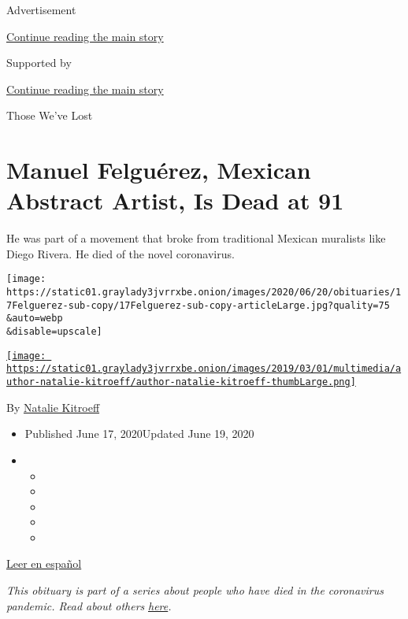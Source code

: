 Advertisement

\protect\hyperlink{after-top}{Continue reading the main story}

Supported by

\protect\hyperlink{after-sponsor}{Continue reading the main story}

Those We've Lost

\hypertarget{manuel-felguuxe9rez-mexican-abstract-artist-is-dead-at-91}{%
\section{Manuel Felguérez, Mexican Abstract Artist, Is Dead at
91}\label{manuel-felguuxe9rez-mexican-abstract-artist-is-dead-at-91}}

He was part of a movement that broke from traditional Mexican muralists
like Diego Rivera. He died of the novel coronavirus.

\texttt{[image: https://static01.graylady3jvrrxbe.onion/images/2020/06/20/obituaries/17Felguerez-sub-copy/17Felguerez-sub-copy-articleLarge.jpg?quality=75\\\&auto=webp\\\&disable=upscale]}

\href{https://www.nytimes3xbfgragh.onion/by/natalie-kitroeff}{\texttt{[image: https://static01.graylady3jvrrxbe.onion/images/2019/03/01/multimedia/author-natalie-kitroeff/author-natalie-kitroeff-thumbLarge.png]}}

By \href{https://www.nytimes3xbfgragh.onion/by/natalie-kitroeff}{Natalie
Kitroeff}

\begin{itemize}
\item
  Published June 17, 2020Updated June 19, 2020
\item
  \begin{itemize}
  \item
  \item
  \item
  \item
  \item
  \end{itemize}
\end{itemize}

\href{https://www.nytimes3xbfgragh.onion/es/2020/06/18/espanol/cultura/muere-covid-manuel-felguerez.html}{Leer
en español}

\emph{This obituary is part of a series about people who have died in
the coronavirus pandemic. Read about others}
\href{https://www.nytimes3xbfgragh.onion/interactive/2020/obituaries/people-died-coronavirus-obituaries.html}{\emph{here}}\emph{.}

